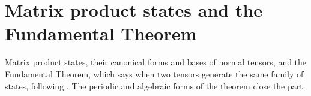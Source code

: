 \part{Matrix product states and the Fundamental Theorem}
\label{part:mps}

Matrix product states, their canonical forms and bases of normal tensors, and
the Fundamental Theorem, which says when two tensors generate the same family
of states, following \cite[Section~IV.A]{Cirac2021Matrix}. The periodic and
algebraic forms of the theorem close the part.
